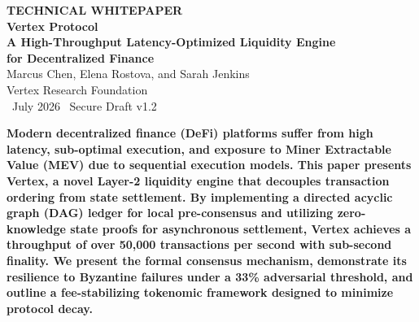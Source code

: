 \documentclass[10pt]{article}
\begin{document}
\begin{center}
    {\color{accent}\sffamily\bfseries\large TECHNICAL WHITEPAPER} \\[0.4cm]
    {\color{primary}\sffamily\Huge\bfseries Vertex Protocol} \\[0.3cm]
    {\color{textdark}\sffamily\Large\bfseries A High-Throughput Latency-Optimized Liquidity Engine\\ for Decentralized Finance} \\[0.6cm]
    {\color{textdark}\sffamily\normalsize Marcus Chen, Elena Rostova, and Sarah Jenkins} \\[0.15cm]
    {\color{textlight}\sffamily\small Vertex Research Foundation} \\[0.4cm]
    {\color{textlight}\sffamily\small \faCalendar\ July 2026 \quad \faLock\ Secure Draft v1.2}
\end{center}

\vspace{0.4cm}

\begin{tcolorbox}[
    colback=bglight,
    colframe=secondary,
    arc=4mm,
    boxrule=1.5pt,
    left=15pt, right=15pt, top=15pt, bottom=15pt,
    title={\color{white}\bfseries Abstract},
    coltitle=white,
    attach boxed title to top left={yshift=-2mm, xshift=5mm},
    boxed title style={colback=secondary, sharp corners=south}
]
\color{textdark}\small\bfseries
Modern decentralized finance (DeFi) platforms suffer from high latency, sub-optimal execution, and exposure to Miner Extractable Value (MEV) due to sequential execution models. This paper presents \textbf{Vertex}, a novel Layer-2 liquidity engine that decouples transaction ordering from state settlement. By implementing a directed acyclic graph (DAG) ledger for local pre-consensus and utilizing zero-knowledge state proofs for asynchronous settlement, Vertex achieves a throughput of over 50,000 transactions per second with sub-second finality. We present the formal consensus mechanism, demonstrate its resilience to Byzantine failures under a 33\% adversarial threshold, and outline a fee-stabilizing tokenomic framework designed to minimize protocol decay.
\end{tcolorbox}







\end{document}

